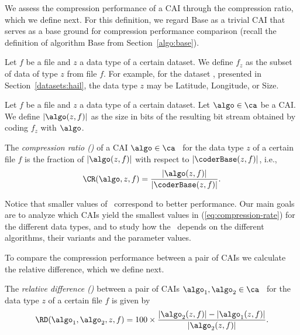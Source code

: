 We assess the compression performance of a CAI through the compression ratio, which we define next. For this definition, we regard Base as a trivial CAI that serves as a base ground for compression performance comparison (recall the definition of algorithm Base from Section~\ref{algo:base}).


\vspace{+5pt}
\begin{defcion}
Let $f$ be a file and $z$ a data type of a certain dataset. We define $f_z$ as the subset of data of type $z$ from file $f$. For example, for the dataset \datasethail, presented in Section~\ref{datasets:hail}, the data type $z$ may be Latitude, Longitude, or Size.
\end{defcion}


\vspace{+2pt}
\begin{defcion}
\label{eq:coding-size}
Let $f$ be a file and $z$ a data type of a certain dataset. Let $\algo \in \ca$ be a CAI. We define $|\algo(z, f)|$ as the size in bits of the resulting bit stream obtained by coding $f_z$ with $\algo$.
\end{defcion}


\vspace{+2pt}
\begin{defcion}
\label{def:compression-rate}
The \textit{compression ratio (\CRit)} of a CAI $\algo \in \ca$ \ for the data type $z$ of a certain file $f$ is the fraction of $|\algo(z, f)|$ with respect to $|\coderBase(z, f)|$, i.e.,
\vspace{-5pt}
\begin{equation}
\label{eq:compression-rate}
\CR(\algo, z, f) = \frac{|\algo(z, f)|}{|\coderBase(z, f)|}.
\end{equation}
\end{defcion}


Notice that smaller values of \CR\ correspond to better performance. Our main goals are to analyze which CAIs yield the smallest values in (\ref{eq:compression-rate}) for the different data types, and to study how the \CR\ depends on the different algorithms, their variants and the parameter values.


\clearpage


To compare the compression performance between a pair of CAIs we calculate the relative difference, which we define next.


\vspace{+5pt}
\begin{defcion}
\label{relative-difference}
The \textit{relative difference (\RDit)} between a pair of CAIs $\algo_1, \algo_2 \in {\ca}$ \ for the data type $z$ of a certain file $f$ is given by
\vspace{-5pt}
\begin{equation}
\label{eq:relative-difference}
\RD(\algo_1, \algo_2, z, f)  =
100\times\frac{|\algo_2 (z, f)| - |\algo_1 (z, f)|}{ |\algo_2 (z, f)| }.
\end{equation}
\end{defcion}


